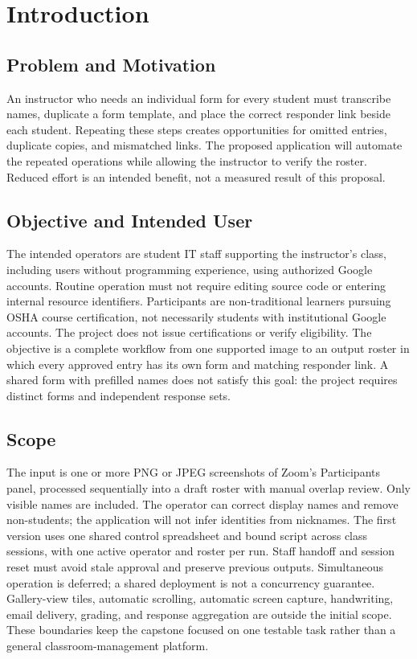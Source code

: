\section{Introduction}
\subsection{Problem and Motivation}
An instructor who needs an individual form for every student must transcribe
names, duplicate a form template, and place the correct responder link beside
each student. Repeating these steps creates opportunities for omitted entries,
duplicate copies, and mismatched links. The proposed application will automate
the repeated operations while allowing the instructor to verify the roster.
Reduced effort is an intended benefit, not a measured result of this proposal.

\subsection{Objective and Intended User}
The intended operators are student IT staff supporting the instructor's class,
including users without programming experience, using authorized Google accounts.
Routine operation must not require editing source code or entering internal
resource identifiers. Participants are non-traditional learners pursuing OSHA course
certification, not necessarily students with institutional Google accounts.
The project does not issue certifications or verify eligibility.
The objective is a complete workflow from one supported image
to an output roster in which every approved entry has its own form and matching
responder link. A shared form with prefilled names does not satisfy this goal:
the project requires distinct forms and independent response sets.

\subsection{Scope}
The input is one or more PNG or JPEG screenshots of Zoom's Participants panel,
processed sequentially into a draft roster with manual overlap review.
Only visible names are included. The operator can correct display names and
remove non-students; the application will not infer identities from nicknames.
The first version uses one shared control spreadsheet and bound script across
class sessions, with one active operator and roster per run. Staff handoff and
session reset must avoid stale approval and preserve previous outputs.
Simultaneous operation is deferred; a shared deployment is not a concurrency guarantee.
Gallery-view tiles, automatic scrolling, automatic
screen capture, handwriting, email delivery, grading, and response aggregation
are outside the initial scope. These boundaries keep the capstone focused on
one testable task rather than a general classroom-management platform.
